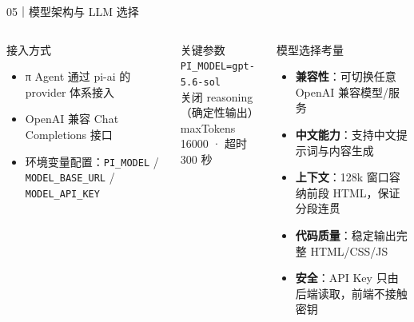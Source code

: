 \documentclass[aspectratio=169,UTF8,11pt]{ctexbeamer}
\begin{document}
\begin{frame}{05｜模型架构与 LLM 选择}
  \begin{columns}[T,onlytextwidth]
      \begin{block}{接入方式}
        \begin{itemize}
          \item π Agent 通过 pi-ai 的 provider 体系接入
          \item OpenAI 兼容 Chat Completions 接口
          \item 环境变量配置：\texttt{PI\_MODEL} / \texttt{MODEL\_BASE\_URL} / \texttt{MODEL\_API\_KEY}
        \end{itemize}
      \end{block}
      \begin{block}{关键参数}
        \texttt{PI\_MODEL=gpt-5.6-sol}\\
        关闭 reasoning（确定性输出）\\
        maxTokens 16000 · 超时 300 秒
      \end{block}
      \begin{block}{模型选择考量}
        \begin{itemize}
          \item \textbf{兼容性}：可切换任意 OpenAI 兼容模型/服务
          \item \textbf{中文能力}：支持中文提示词与内容生成
          \item \textbf{上下文}：128k 窗口容纳前段 HTML，保证分段连贯
          \item \textbf{代码质量}：稳定输出完整 HTML/CSS/JS
          \item \textbf{安全}：API Key 只由后端读取，前端不接触密钥
        \end{itemize}
      \end{block}
  \end{columns}
\end{frame}
\end{document}

